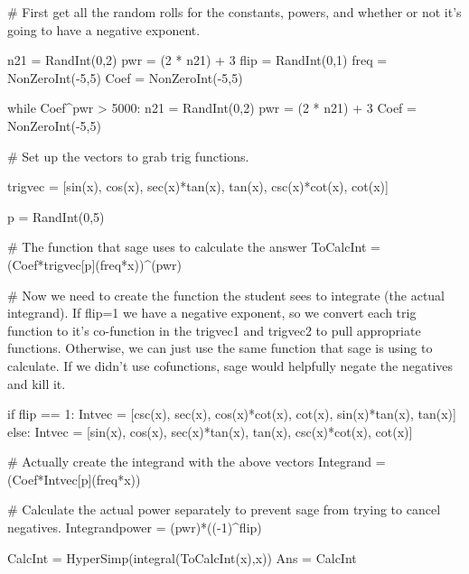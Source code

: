 


\begin{sagesilent}
# First get all the random rolls for the constants, powers, and whether or not it's going to have a negative exponent.

n21 = RandInt(0,2)
pwr = (2 * n21) + 3
flip = RandInt(0,1)
freq = NonZeroInt(-5,5)
Coef = NonZeroInt(-5,5)

while Coef^pwr > 5000:
    n21 = RandInt(0,2)
    pwr = (2 * n21) + 3
    Coef = NonZeroInt(-5,5)

# Set up the vectors to grab trig functions.

trigvec = [sin(x), cos(x), sec(x)*tan(x), tan(x), csc(x)*cot(x), cot(x)]

p = RandInt(0,5)

# The function that sage uses to calculate the answer
ToCalcInt = (Coef*trigvec[p](freq*x))^(pwr)

# Now we need to create the function the student sees to integrate (the actual integrand). If flip=1 we have a negative exponent, so we convert each trig function to it's co-function in the trigvec1 and trigvec2 to pull appropriate functions. Otherwise, we can just use the same function that sage is using to calculate. If we didn't use cofunctions, sage would helpfully negate the negatives and kill it.

if flip == 1:
    Intvec = [csc(x), sec(x), cos(x)*cot(x), cot(x), sin(x)*tan(x), tan(x)]
else:
    Intvec = [sin(x), cos(x), sec(x)*tan(x), tan(x), csc(x)*cot(x), cot(x)]

# Actually create the integrand with the above vectors
Integrand = (Coef*Intvec[p](freq*x))

# Calculate the actual power separately to prevent sage from trying to cancel negatives.
Integrandpower = (pwr)*((-1)^flip)

CalcInt = HyperSimp(integral(ToCalcInt(x),x))
Ans = CalcInt
\end{sagesilent}


